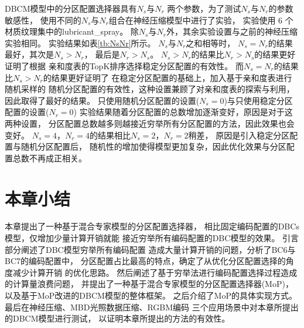 DBCM模型中的分区配置选择器具有$N_s$与$N_r$
两个参数，为了测试$N_s$与$N_r$的参数敏感性，
使用不同的$N_s$与$N_r$组合在神经压缩模型中进行了实验，
实验使用 6 个材质纹理集中的lubricant\_spray。
除$N_s$与$N_r$外，其余实验设置与之前的神经压缩实验相同。
实验结果如表\ref{tb:NsNr}所示。
$N_s$与$N_r$之和相等时，
$N_s=N_r$的结果最好，其次是$N_s>N_r$，
最后是$N_r>N_s$。
$N_s>N_r$的结果比$N_r>N_s$的结果更好证明了根据
亲和度表的TopK排序选择稳定分区配置的有效性。
而$N_s=N_r$的结果比$N_s>N_r$的结果更好证明了
在稳定分区配置的基础上，加入基于亲和度表进行随机采样的
随机分区配置的有效性，这种设置兼顾了对亲和度表的探索与利用，
因此取得了最好的结果。
只使用随机分区配置的设置($N_s=0$)与只使用稳定分区配置的设置($N_r=0$)
实验结果随着分区配置的总数增加逐渐变好，原因是对于这两种设置，
分区配置总数越多则越接近穷举所有分区配置的方法，因此效果也会变好。
$N_s=4$，$N_r=4$的结果相比$N_s=2$，$N_r=2$稍差，
原因是引入稳定分区配置与随机分区配置后，
随机性的增加使得模型更加复杂，因此优化效果与分区配置总数不再成正相关。

\begin{table*}[htbp]
    \centering
    \caption{ $N_s$与$N_r$的参数敏感性实验结果}
    \label{tb:NsNr}
\end{table*}

\section{本章小结}

本章提出了一种基于混合专家模型的分区配置选择器，
相比固定编码配置的DBCs模型，仅增加少量计算开销就能
接近穷举所有编码配置的DBC模型的效果。
引言部分阐述了DBC模型穷举所有编码配置
造成大量计算开销的问题，分析了BC6与BC7的编码配置中，
分区配置占比最高的特点，确定了从优化分区配置选择的角度减少计算开销
的优化思路。
然后阐述了基于穷举法进行编码配置选择过程造成的计算量浪费问题，
并提出了一种基于混合专家模型的分区配置选择器(MoP)，
以及基于MoP改进的DBCM模型的整体框架。
之后介绍了MoP的具体实现方式。
最后在神经压缩、MBD光照数据压缩、RGBM编码
三个应用场景中对本章所提出的DBCM模型进行测试，
以证明本章所提出的方法的有效性。